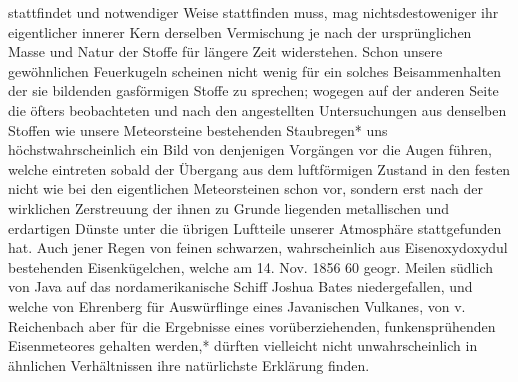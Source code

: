 \documentclass[a4paper, 11pt, oneside, polutonikogreek, german]{article}
\begin{document}
stattfindet und notwendiger Weise stattfinden muss, mag nichtsdestoweniger ihr eigentlicher innerer Kern derselben Vermischung je nach der ursprünglichen Masse und Natur der Stoffe für längere Zeit widerstehen. Schon unsere gewöhnlichen Feuerkugeln scheinen nicht wenig für ein solches Beisammenhalten der sie bildenden gasförmigen Stoffe zu sprechen; wogegen auf der anderen Seite die öfters beobachteten und nach den angestellten Untersuchungen aus denselben Stoffen wie unsere Meteorsteine bestehenden Staubregen* uns höchstwahrscheinlich ein Bild von denjenigen Vorgängen vor die Augen führen, welche eintreten sobald der Übergang aus dem luftförmigen Zustand in den festen nicht wie bei den eigentlichen Meteorsteinen schon vor, sondern erst nach der wirklichen Zerstreuung der ihnen zu Grunde liegenden metallischen und erdartigen Dünste unter die übrigen Luftteile unserer Atmosphäre stattgefunden hat. Auch jener Regen von feinen schwarzen, wahrscheinlich aus Eisenoxydoxydul bestehenden Eisenkügelchen, welche am 14. Nov. 1856 60 geogr. Meilen südlich von Java auf das nordamerikanische Schiff Joshua Bates niedergefallen, und welche von Ehrenberg für Auswürflinge eines Javanischen Vulkanes, von v. Reichenbach aber für die Ergebnisse eines vorüberziehenden, funkensprühenden Eisenmeteores gehalten werden,* dürften vielleicht nicht unwahrscheinlich in ähnlichen Verhältnissen ihre natürlichste Erklärung finden.
\end{document}
